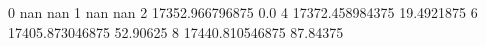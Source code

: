 0 nan nan
1 nan nan
2 17352.966796875 0.0
4 17372.458984375 19.4921875
6 17405.873046875 52.90625
8 17440.810546875 87.84375
